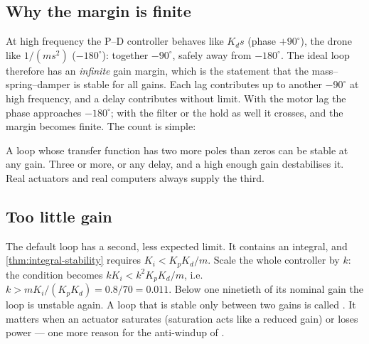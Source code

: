 \subsection{Why the margin is finite}
At high frequency the P–D controller behaves like $K_ds$ (phase $+90^\circ$), the drone like $1/(ms^2)$ ($-180^\circ$): together $-90^\circ$, safely away from $-180^\circ$. The ideal loop therefore has an \emph{infinite} gain margin, which is the statement that the mass–spring–damper is stable for all gains. Each lag contributes up to another $-90^\circ$ at high frequency, and a delay contributes without limit. With the motor lag the phase approaches $-180^\circ$; with the filter or the hold as well it crosses, and the margin becomes finite. The count is simple:
\begin{keyidea}
A loop whose transfer function has two more poles than zeros can be stable at any gain. Three or more, or any delay, and a high enough gain destabilises it. Real actuators and real computers always supply the third.
\end{keyidea}

\subsection{Too little gain}
The default loop has a second, less expected limit. It contains an integral, and \cref{thm:integral-stability} requires $K_i < K_pK_d/m$. Scale the whole controller by $k$: the condition becomes $kK_i < k^2K_pK_d/m$, i.e.\ $k > mK_i/(K_pK_d) = 0.8/70 = 0.011$. Below one ninetieth of its nominal gain the loop is unstable again. A loop that is stable only between two gains is called . It matters when an actuator saturates (saturation acts like a reduced gain) or loses power — one more reason for the anti-windup of .

